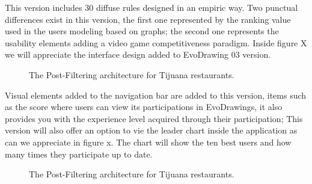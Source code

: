 This version includes 30 diffuse rules designed in an empiric way.
Two punctual differences exist in this version, the first one represented by the ranking value used in the users modeling based on graphs; the second one represents the usability elements adding a video game competitiveness paradigm.   Inside figure X we will appreciate the interface design added to EvoDrawing 03 version.

\begin{figure}
	\centering
	\setlength\fboxsep{0pt}
	\caption{The Post-Filtering architecture for Tijuana restaurants.}
	\label{fig:postfiltering6}     
\end{figure}


Visual elements added to the navigation bar are added to this version, items such as the score where users can view its participations in EvoDrawings, it also provides you with the experience level acquired through their participation; This version will also offer an option to vie the leader chart inside the application as can we appreciate in figure x. The chart will show the ten best users and how many times they participate up to date.

\begin{figure}
	\centering
	\setlength\fboxsep{0pt}
	\caption{The Post-Filtering architecture for Tijuana restaurants.}
	\label{fig:postfiltering8}     
\end{figure}

